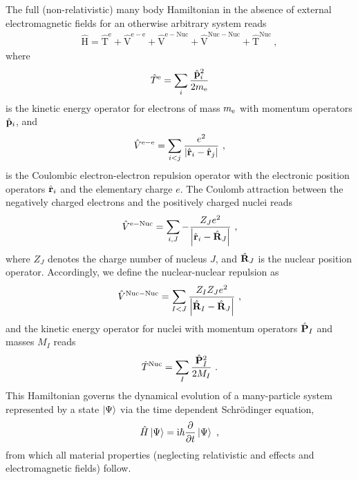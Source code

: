 The full (non-relativistic) many body Hamiltonian in the absence of external electromagnetic fields for an otherwise arbitrary system reads
\begin{align}
    \hat{\mathrm{H}}
        = \hat{\mathrm{T}}^{\mathrm{e}}
        + \hat{\mathrm{V}}^{\mathrm{e}-\mathrm{e}}
        + \hat{\mathrm{V}}^{\mathrm{e}-\mathrm{Nuc}}
        + \hat{\mathrm{V}}^{\mathrm{Nuc}-\mathrm{Nuc}}
        + \hat{\mathrm{T}}^{\mathrm{Nuc}}~,
    \label{eq:Hamiltonian}
\end{align}
where
\begin{align}
    \hat T^{\rm e} 
        =\sum_{i} \frac{\hat{\mathbf{p}}_{i}^{2}}{2 m_{\rm e}}
    \label{eq:Te}
\end{align}
is the kinetic energy operator for electrons of mass $m_{\rm e}$ with momentum operators $\hat{\bf p}_i$, and 
\begin{align}
    \hat V^{\rm e-e}
        = \sum_{i < j} \frac{e^{2}}{\left|\hat{{\bf r}}_{i}-\hat{\bf r}_{j}\right|}~,
    \label{eq:Ve}
\end{align}
is the Coulombic electron-electron repulsion operator with the electronic position operators $\hat{\bf r}_i$ and the elementary charge $e$. 
The Coulomb attraction between the negatively charged electrons and the positively charged nuclei reads
\begin{align}
    \hat V^{\rm e-Nuc}
        = \sum_{i, J} -\frac{Z_J e^{2}}{\left|\hat{{\bf r}}_{i}-\hat{\bf R}_{J}\right|}~,
    \label{eq:Venuc}
\end{align}
where $Z_J$ denotes the charge number of nucleus $J$, and $\hat{\bf R}_J$ is the nuclear position operator. 
Accordingly, we define the nuclear-nuclear repulsion as
\begin{align}
    \hat V^{\rm Nuc-Nuc}
        = \sum_{I < J} \frac{Z_{I} Z_{J} e^{2}}{\left|\hat{{\bf R}}_{I}-\hat{\bf R}_{J}\right|}~,
    \label{eq:Vnuc}
\end{align}
and the kinetic energy operator for nuclei with momentum operators $\hat{\bf P}_I$ and masses $M_I$ reads
\begin{align}
    \hat T^{\rm Nuc} 
        =\sum_{I} \frac{\hat{\mathbf{P}}_{I}^{2}}{2 M_{I}}~.
    \label{eq:Tnuc}
\end{align}
This Hamiltonian governs the dynamical evolution of a many-particle system represented by a state $\ket{\Psi}$ via the time dependent Schr\"odinger equation,
\begin{align}
	\hat H \ket{\Psi} = {\rm i} \hbar \frac{\partial}{\partial t} \ket{\Psi}~,
	\label{eq:TdSE}
\end{align}
from which all material properties (neglecting relativistic and effects and electromagnetic fields) follow.

